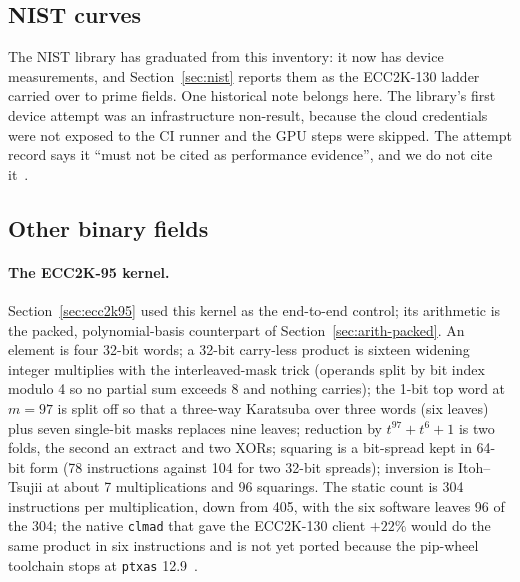 \subsection{NIST curves}
\label{sec:othergpu-nist}

The NIST library has graduated from this inventory: it now has device
measurements, and Section~\ref{sec:nist} reports them as the ECC2K-130
ladder carried over to prime fields. One historical note belongs
here. The library's first device attempt was an infrastructure
non-result, because the cloud credentials were not exposed to the CI
runner and the GPU steps were skipped. The attempt record says it
``must not be cited as performance evidence'', and we do not cite
it~.

\subsection{Other binary fields}
\label{sec:othergpu-binary}

\paragraph{The ECC2K-95 kernel.} Section~\ref{sec:ecc2k95} used this
kernel as the end-to-end control; its arithmetic is the packed,
polynomial-basis counterpart of Section~\ref{sec:arith-packed}. An
element is four 32-bit words; a 32-bit carry-less product is sixteen
widening integer multiplies with the interleaved-mask trick (operands
split by bit index modulo 4 so no partial sum exceeds 8 and nothing
carries); the 1-bit top word at $m=97$ is split off so that a
three-way Karatsuba over three words (six leaves) plus seven
single-bit masks replaces nine leaves; reduction by $t^{97}+t^6+1$ is
two folds, the second an extract and two XORs; squaring is a
bit-spread kept in 64-bit form (78 instructions against 104 for two
32-bit spreads); inversion is Itoh--Tsujii at about 7 multiplications
and 96 squarings. The static count is 304 instructions per
multiplication, down from 405, with the six software leaves 96 of the
304; the native \texttt{clmad} that gave the ECC2K-130 client $+22\%$
would do the same product in six instructions and is not yet ported
because the pip-wheel toolchain stops at \texttt{ptxas}
12.9~.

